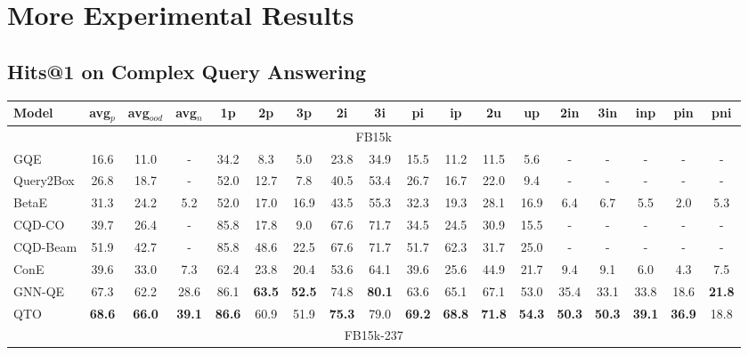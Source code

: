 \section{More Experimental Results}

\subsection{Hits@1 on Complex Query Answering}
\label{app:h@1}

\begin{table*}[!h]
    \centering
    \begin{adjustbox}{width=\textwidth}
    \begin{tabular}{lccccccccccccccccc}
        \toprule
        \bf{Model} & \bf{avg$_p$} & \bf{avg$_{ood}$} & \bf{avg$_n$} & \bf{1p} & \bf{2p} & \bf{3p} & \bf{2i} & \bf{3i} & \bf{pi} & \bf{ip} & \bf{2u} & \bf{up} & \bf{2in} & \bf{3in} & \bf{inp} & \bf{pin} & \bf{pni} \\
        \midrule
        \multicolumn{18}{c}{FB15k} \\
        \midrule
        GQE & 16.6 & 11.0 & - & 34.2 & 8.3 & 5.0 & 23.8 & 34.9 & 15.5 & 11.2 & 11.5 & 5.6 & - & - & - & - & - \\
        Query2Box & 26.8 & 18.7 & - & 52.0 & 12.7 & 7.8 & 40.5 & 53.4 & 26.7 & 16.7 & 22.0 & 9.4 & - & - & - & - & - \\
        BetaE & 31.3 & 24.2 & 5.2 & 52.0 & 17.0 & 16.9 & 43.5 & 55.3 & 32.3 & 19.3 & 28.1 & 16.9 & 6.4 & 6.7 & 5.5 & 2.0 & 5.3 \\
        CQD-CO & 39.7 & 26.4 & - & 85.8 & 17.8 & 9.0 & 67.6 & 71.7 & 34.5 & 24.5 & 30.9 & 15.5 & - & - & - & - & - \\
        CQD-Beam & 51.9 & 42.7 & - & 85.8 & 48.6 & 22.5 & 67.6 & 71.7 & 51.7 & 62.3 & 31.7 & 25.0 & - & - & - & - & - \\
        ConE & 39.6 & 33.0 & 7.3 & 62.4 & 23.8 & 20.4 & 53.6 & 64.1 & 39.6 & 25.6 & 44.9 & 21.7 & 9.4 & 9.1 & 6.0 & 4.3 & 7.5 \\
        GNN-QE & 67.3 & 62.2 & 28.6 & 86.1 & \bf{63.5} & \bf{52.5} & 74.8 & \bf{80.1} & 63.6 & 65.1 & 67.1 & 53.0 & 35.4 & 33.1 & 33.8 & 18.6 & \bf{21.8} \\
        \midrule
        QTO & \bf{68.6} & \bf{66.0} & \bf{39.1} & \bf{86.6} & 60.9 & 51.9 & \bf{75.3} & 79.0 & \bf{69.2} & \bf{68.8} & \bf{71.8} & \bf{54.3} & \bf{50.3} & \bf{50.3} & \bf{39.1} & \bf{36.9} & 18.8 \\
        \midrule[0.08em]
        \multicolumn{18}{c}{FB15k-237} \\

\end{tabular}
\end{adjustbox}
\end{table*}
